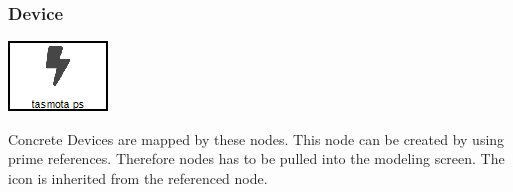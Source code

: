 \subsubsection{Device}
\noindent\begin{minipage}{0.15\textwidth}%
	\includegraphics[width=\linewidth]{assets/images/sensor}
\end{minipage}%
\hfill%
\begin{minipage}{0.8\textwidth}
	Concrete Devices are mapped by these nodes. This node can be created by using prime references. Therefore  nodes has to be pulled into the modeling screen. The icon is inherited from the referenced node.
\end{minipage}

